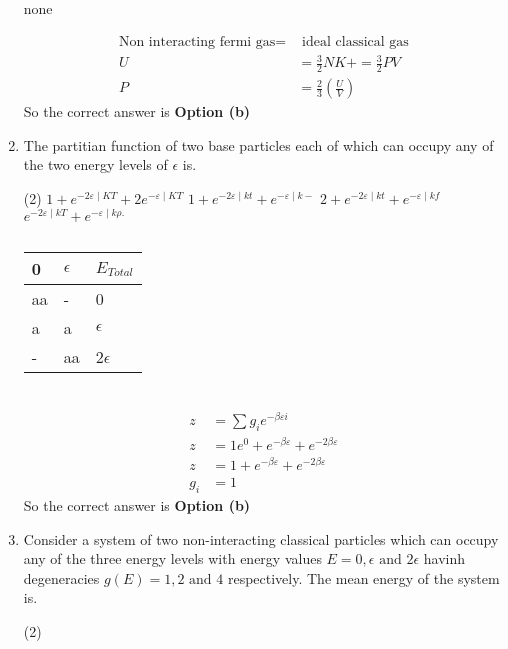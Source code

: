 \begin{enumerate}
\begin{tasks}
		\task[\textbf{d.}]  none
	\end{tasks}
	\begin{answer}
		\begin{align*}
		\text{Non interacting fermi gas=}&\text{ ideal classical gas}\\
		U&=\frac{3}{2} N K+=\frac{3}{2} P V\\
		P&=\frac{2}{3}\left(\frac{U}{V}\right)
		\end{align*}
		So the correct answer is \textbf{Option (b)}
	\end{answer}
	\item The partitian function of two base particles each of which can occupy any of the two energy levels of $\epsilon$ is.
	\begin{tasks}(2)
		\task[\textbf{a.}] $1+e^{-2 \varepsilon \mid K T}+2 e^{-\varepsilon \mid K T}$
		\task[\textbf{b.}] $1+e^{-2 \varepsilon \mid k t}+e^{-\varepsilon \mid k-}$
		\task[\textbf{c.}]$2+e^{-2 \varepsilon \mid k t}+e^{-\varepsilon \mid k f}$
		\task[\textbf{d.}] $e^{-2 \varepsilon \mid k T}+e^{-\varepsilon \mid k \rho \text {. }}$
	\end{tasks}  
	\begin{answer}$\left. \right. $\\
		\begin{tabular}{|p{1cm}|p{1cm}|p{2cm}|}
			\hline
			0 & $\epsilon$ & $E_{Total}$\\\hline
			aa&-&0\\\hline
			a&a&$\epsilon$\\\hline
			-&aa&2$\epsilon$\\\hline
		\end{tabular}\\
		\begin{align*}
		z&=\sum g_{i} e^{-\beta \varepsilon i} \\
		z&=1 e^{0}+e^{-\beta \varepsilon}+e^{-2 \beta \varepsilon} \\
		z&=1+e^{-\beta \varepsilon}+e^{-2 \beta \varepsilon}\\
		g_{i}&=1
		\end{align*}
		So the correct answer is \textbf{Option (b)}
	\end{answer}
	\item Consider a system of two non-interacting classical particles which can occupy any of the three energy levels with energy values $E=0,\epsilon \text{ and }2\epsilon$ havinh degeneracies $g(E)=1,2 \text{ and } 4$ respectively. The mean energy of the system is.
	\begin{tasks}(2)

\end{tasks}
\end{enumerate}
